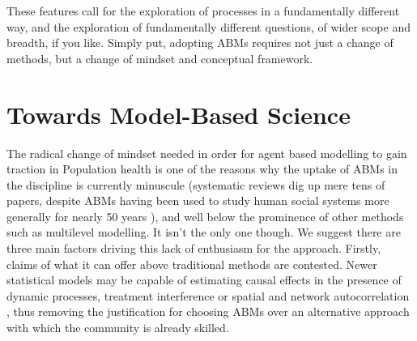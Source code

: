 \documentclass[review]{elsarticle}
\begin{document}


These features call for the exploration of processes in a fundamentally different way, and the exploration of fundamentally different questions, of wider scope and breadth, if you like. Simply put, adopting ABMs requires not just a change of methods, but a change of mindset and conceptual framework.

\section{Towards Model-Based Science}

The radical change of mindset needed in order for agent based modelling to gain traction in Population health is one of the reasons why the uptake of ABMs in the discipline is currently minuscule (systematic reviews dig up mere tens of papers, despite ABMs having been used to study human social systems more generally for nearly 50 years \citep{nianogo2015}), and well below the prominence of other methods such as multilevel modelling. It isn't the only one though. We suggest there are three main factors driving this lack of enthusiasm for the approach. Firstly, claims of what it can offer above traditional methods are contested. Newer statistical models may be capable of estimating causal effects in the presence of dynamic processes, treatment interference or spatial and network autocorrelation \citep{naimi2016}, thus removing the justification for choosing ABMs over an alternative approach with which the community is already skilled. 
\end{document}
